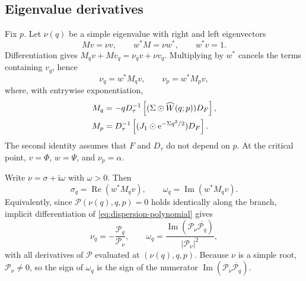 \documentclass[11pt]{article}
\newcommand{\ii}{\mathrm{i}}
\newcommand{\ee}{\mathrm{e}}
\DeclareMathOperator{\RePart}{Re}
\begin{document}
\subsection{Eigenvalue derivatives}
Fix $p$. Let $\nu(q)$ be a simple eigenvalue with right and left eigenvectors
\begin{equation}
 Mv=\nu v,\qquad w^*M=\nu w^*,\qquad w^*v=1.
\end{equation}
Differentiation gives $M_qv+Mv_q=\nu_qv+\nu v_q$. Multiplying by $w^*$
cancels the terms containing $v_q$, hence
\begin{equation}
 \boxed{\nu_q=w^*M_qv,\qquad \nu_p=w^*M_pv,}
 \label{eq:dispersion-derivatives}
\end{equation}
where, with entrywise exponentiation,
\begin{align}
 M_q&=-qD_\tau^{-1}\left[(\Sigma\odot\widehat W(q;p))D_F\right],\notag\\
 M_p&=D_\tau^{-1}\left[(J_1\odot\ee^{-\Sigma q^2/2})D_F\right].
 \label{eq:dispersion-matrix-derivatives}
\end{align}
The second identity assumes that $F$ and $D_\tau$ do not depend on $p$.
At the critical point, $v=\Phi$, $w=\Psi$, and $\nu_p=\alpha$.

Write $\nu=\sigma+\ii\omega$ with $\omega>0$. Then
\begin{equation}
 \sigma_q=\RePart(w^*M_qv),\qquad
 \boxed{\omega_q=\operatorname{Im}(w^*M_qv).}
 \label{eq:frequency-slope}
\end{equation}
Equivalently, since $\mathcal P(\nu(q),q,p)=0$ holds identically along the
branch, implicit differentiation of \eqref{eq:dispersion-polynomial} gives
\begin{equation}
 \nu_q=-\frac{\mathcal P_q}{\mathcal P_\nu},\qquad
 \boxed{\omega_q=
 \frac{\operatorname{Im}(\mathcal P_\nu\overline{\mathcal P_q})}
 {|\mathcal P_\nu|^2},}
 \label{eq:frequency-polynomial-sign}
\end{equation}
with all derivatives of $\mathcal P$ evaluated at $(\nu(q),q,p)$.
Because $\nu$ is a simple root, $\mathcal P_\nu\neq0$, so the sign of
$\omega_q$ is the sign of the numerator
$\operatorname{Im}(\mathcal P_\nu\overline{\mathcal P_q})$.
\end{document}
